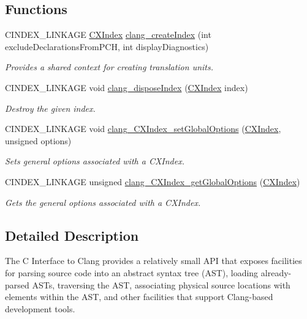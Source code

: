 \subsection*{Functions}
\begin{DoxyCompactItemize}
\item 
C\+I\+N\+D\+E\+X\+\_\+\+L\+I\+N\+K\+A\+GE \hyperlink{group__CINDEX_gae039c2574bfd75774ca7a9a3e55910cb}{C\+X\+Index} \hyperlink{group__CINDEX_ga51eb9b38c18743bf2d824c6230e61f93}{clang\+\_\+create\+Index} (int exclude\+Declarations\+From\+P\+CH, int display\+Diagnostics)
\begin{DoxyCompactList}\small\item\em Provides a shared context for creating translation units. \end{DoxyCompactList}\item 
C\+I\+N\+D\+E\+X\+\_\+\+L\+I\+N\+K\+A\+GE void \hyperlink{group__CINDEX_ga166ab73b14be73cbdcae14d62dbab22a}{clang\+\_\+dispose\+Index} (\hyperlink{group__CINDEX_gae039c2574bfd75774ca7a9a3e55910cb}{C\+X\+Index} index)
\begin{DoxyCompactList}\small\item\em Destroy the given index. \end{DoxyCompactList}\item 
C\+I\+N\+D\+E\+X\+\_\+\+L\+I\+N\+K\+A\+GE void \hyperlink{group__CINDEX_ga82c320cc4c21dfd64650b3995cb5e7a6}{clang\+\_\+\+C\+X\+Index\+\_\+set\+Global\+Options} (\hyperlink{group__CINDEX_gae039c2574bfd75774ca7a9a3e55910cb}{C\+X\+Index}, unsigned options)
\begin{DoxyCompactList}\small\item\em Sets general options associated with a C\+X\+Index. \end{DoxyCompactList}\item 
C\+I\+N\+D\+E\+X\+\_\+\+L\+I\+N\+K\+A\+GE unsigned \hyperlink{group__CINDEX_ga21e96379358f2aedc56890f9a35d4125}{clang\+\_\+\+C\+X\+Index\+\_\+get\+Global\+Options} (\hyperlink{group__CINDEX_gae039c2574bfd75774ca7a9a3e55910cb}{C\+X\+Index})
\begin{DoxyCompactList}\small\item\em Gets the general options associated with a C\+X\+Index. \end{DoxyCompactList}\end{DoxyCompactItemize}


\subsection{Detailed Description}
The C Interface to Clang provides a relatively small A\+PI that exposes facilities for parsing source code into an abstract syntax tree (A\+ST), loading already-\/parsed A\+S\+Ts, traversing the A\+ST, associating physical source locations with elements within the A\+ST, and other facilities that support Clang-\/based development tools.

